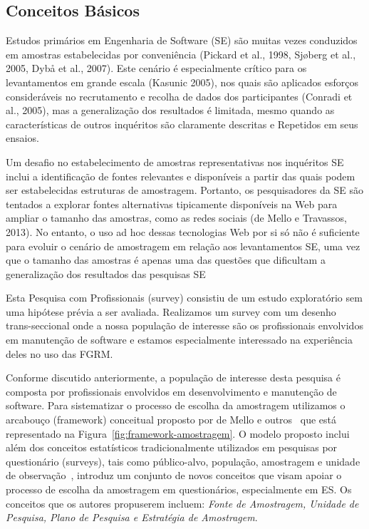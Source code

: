 \subsection{Conceitos Básicos}
Estudos primários em Engenharia de Software (SE) são muitas vezes conduzidos em
amostras estabelecidas por conveniência (Pickard et al., 1998, Sjøberg et al.,
2005, Dybå et al., 2007). Este cenário é especialmente crítico para os
levantamentos em grande escala (Kasunic 2005), nos quais são aplicados esforços
consideráveis no recrutamento e recolha de dados dos participantes (Conradi et
al., 2005), mas a generalização dos resultados é limitada, mesmo quando as
características de outros inquéritos são claramente descritas e Repetidos em
seus ensaios.

Um desafio no estabelecimento de amostras representativas nos inquéritos SE
inclui a identificação de fontes relevantes e disponíveis a partir das quais
podem ser estabelecidas estruturas de amostragem. Portanto, os pesquisadores da
SE são tentados a explorar fontes alternativas tipicamente disponíveis na Web
para ampliar o tamanho das amostras, como as redes sociais (de Mello e
Travassos, 2013). No entanto, o uso ad hoc dessas tecnologias Web por si só não
é suficiente para evoluir o cenário de amostragem em relação aos levantamentos
SE, uma vez que o tamanho das amostras é apenas uma das questões que dificultam
a generalização dos resultados das pesquisas SE

Esta Pesquisa com Profissionais (survey) consistiu de um estudo exploratório sem
uma hipótese prévia a ser avaliada. Realizamos um survey com um desenho
trans-seccional\cite{kitchenham2002principles} onde a nossa população de
interesse são os profissionais envolvidos em manutenção de software e estamos
especialmente interessado na experiência deles no uso das FGRM\@.

Conforme discutido anteriormente, a população de interesse desta pesquisa é
composta por profissionais envolvidos em desenvolvimento e manutenção de
software. Para sistematizar o processo de escolha da amostragem utilizamos o
arcabouço (framework) conceitual proposto por de Mello e
outros~\cite{de2014towards} que está representado na
Figura~\ref{fig:framework-amostragem}. O modelo proposto inclui além dos
conceitos estatísticos tradicionalmente utilizados em pesquisas por questionário
(surveys), tais como público-alvo, população, amostragem e unidade de
observação~\cite{thompson2012sampling}, introduz um conjunto de novos conceitos
que visam apoiar o processo de escolha da amostragem em questionários,
especialmente em ES\@. Os conceitos que os autores propuserem incluem:
\textit{Fonte de Amostragem, Unidade de Pesquisa, Plano de Pesquisa e Estratégia
	de Amostragem}.

